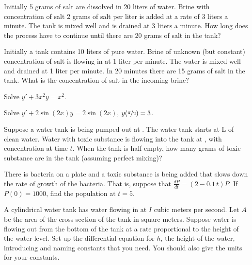 \begin{exercise}
Initially 5 grams of salt are dissolved in 20 liters of water.  Brine
with concentration of salt 2 grams of salt per liter is added at a rate
of 3 liters a minute.  The tank is mixed well and is drained at 3 liters
a minute.  How long does the process have to continue until there are 20 grams
of salt in the tank?
\end{exercise}

\begin{exercise}
Initially a tank contains 10 liters of pure water.
Brine of unknown (but constant) concentration
of salt is flowing in at 1 liter per minute.
The water is mixed well and drained at 1 liter per minute.
In 20 minutes there are 15 grams of salt in the tank.  What is the
concentration of salt in the incoming brine?
\end{exercise}

\setcounter{exercise}{100}

\begin{exercise}
Solve $y'+3 x^2 y = x^2$.
\end{exercise}

\begin{exercise}
Solve $y'+ 2\sin(2x) y = 2\sin(2x)$, $y(\nicefrac{\pi}{2}) = 3$.
\end{exercise}

\begin{exercise}
Suppose a water tank is being pumped out at .  The
water tank starts at \unit[10]{L} of clean water.
Water with
toxic substance is flowing into the tank at ,
with concentration  at time $t$.
When the tank is half empty, how many grams of toxic substance are in the
tank (assuming perfect mixing)?
\end{exercise}

\begin{exercise}
There is bacteria on a plate and a toxic substance is being added that slows
down the rate of growth of the bacteria.
That is,
suppose that $\frac{dP}{dt} = (2-0.1\,t)P$.  If $P(0) = 1000$, find
the population at $t=5$.
\end{exercise}

\begin{exercise}
A cylindrical water tank has water flowing in at $I$ cubic meters
per second.
Let $A$ be the area of the cross section of the tank in square meters.
Suppose water is
flowing out from the bottom of the tank at a rate proportional to the height of
the water level.  Set up the differential equation for $h$, the height of the
water, introducing and naming
constants that you need.  You should also give the units for your constants.
\end{exercise}


